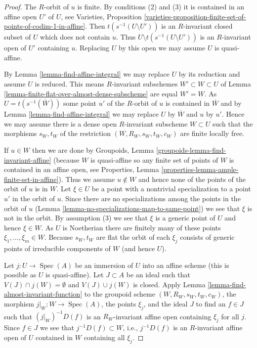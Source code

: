 \documentclass[10pt,a4paper]{amsart}
\theoremstyle{plain}
\theoremstyle{definition}
\theoremstyle{remark}
\numberwithin{equation}{subsection}
\def\Spec{\mathop{\mathrm{Spec}}}
\begin{document}
\begin{proof}
The $R$-orbit of $u$ is finite. By conditions (2) and (3) it is contained
in an affine open $U'$ of $U$, see
Varieties, Proposition
\ref{varieties-proposition-finite-set-of-points-of-codim-1-in-affine}.
Then $t(s^{-1}(U \setminus U'))$ is an $R$-invariant
closed subset of $U$ which does not contain $u$. Thus
$U \setminus t(s^{-1}(U \setminus U'))$ is an $R$-invariant open
of $U'$ containing $u$.
Replacing $U$ by this open we may assume $U$ is quasi-affine.

\medskip\noindent
By Lemma \ref{lemma-find-affine-integral} we may replace $U$ by its reduction
and assume $U$ is reduced. This means $R$-invariant subschemes
$W' \subset W \subset U$ of
Lemma \ref{lemma-finite-flat-over-almost-dense-subscheme}
are equal $W' = W$. As $U = t(s^{-1}(\overline{W}))$ some point
$u'$ of the $R$-orbit of $u$ is contained in $\overline{W}$
and by Lemma \ref{lemma-find-affine-integral}
we may replace $U$ by $\overline{W}$ and $u$ by $u'$.
Hence we may assume there is
a dense open $R$-invariant subscheme $W \subset U$ such that
the morphisms $s_W, t_W$ of the restriction $(W, R_W, s_W, t_W, c_W)$ are
finite locally free.

\medskip\noindent
If $u \in W$ then we are done by
Groupoids, Lemma \ref{groupoids-lemma-find-invariant-affine}
(because $W$ is quasi-affine so any finite set of points
of $W$ is contained in an affine open, see
Properties, Lemma \ref{properties-lemma-ample-finite-set-in-affine}).
Thus we assume $u \not \in W$ and hence none of the points of the
orbit of $u$ is in $W$. Let $\xi \in U$
be a point with a nontrivial specialization to a point $u'$ in the orbit
of $u$. Since there are no specializations among the points in the
orbit of $u$ (Lemma \ref{lemma-no-specializations-map-to-same-point})
we see that $\xi$ is not in the orbit.
By assumption (3) we see that $\xi$ is a generic point of $U$
and hence $\xi \in W$.
As $U$ is Noetherian there are finitely many of these
points $\xi_1, \ldots, \xi_m \in W$. Because $s_W, t_W$ are flat the orbit
of each $\xi_j$ consists of generic points of irreducible components
of $W$ (and hence $U$).

\medskip\noindent
Let $j : U \to \Spec(A)$ be an immersion of $U$ into an affine scheme
(this is possible as $U$ is quasi-affine). Let $J \subset A$
be an ideal such that $V(J) \cap j(W) = \emptyset$ and $V(J) \cup j(W)$
is closed. Apply Lemma \ref{lemma-find-almost-invariant-function}
to the groupoid scheme $(W, R_W, s_W, t_W, c_W)$, the morphism
$j|_W : W \to \Spec(A)$, the points $\xi_j$, and the ideal $J$
to find an $f \in J$ such that $(j|_W)^{-1}D(f)$ is an $R_W$-invariant
affine open containing $\xi_j$ for all $j$. Since $f \in J$
we see that $j^{-1}D(f) \subset W$, i.e., $j^{-1}D(f)$ is
an $R$-invariant affine open of $U$ contained in $W$
containing all $\xi_j$.


\end{proof}
\end{document}
